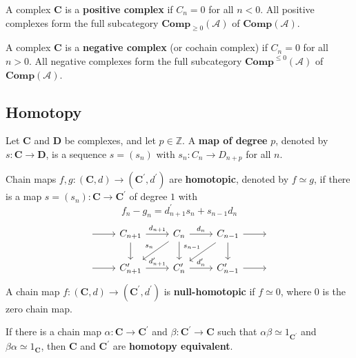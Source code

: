 \documentclass[12pt, oneside]{book}
\begin{document}
\begin{definition}
    A complex $\mathbf{C}$ is a \textbf{positive complex} if $C_n=0$ for all $n<0$.
    All positive complexes form the full subcategory $\mathbf{C o m p}_{\geq 0}(\mathcal{A})$ of $\mathbf{C o m p}(\mathcal{A})$.

    A complex $\mathbf{C}$ is a \textbf{negative complex} (or cochain complex) if $C_n=0$ for all $n>0$.
    All negative complexes form the full subcategory $\mathbf{C o m p}^{\leq 0}(\mathcal{A})$ of $\mathbf{C o m p}(\mathcal{A})$.

\end{definition}


\subsection{Homotopy} %
\begin{definition}
    Let $\mathbf{C}$ and $\mathbf{D}$ be complexes, and let $p \in \mathbb{Z}$.
    A \textbf{map of degree} $p$, denoted by $s: \mathbf{C} \rightarrow \mathbf{D}$, is a sequence $s=\left(s_n\right)$ with $s_n: C_n \rightarrow D_{n+p}$ for all $n$.
\end{definition}

\begin{definition}
    Chain maps $f, g:(\mathbf{C}, d) \rightarrow\left(\mathbf{C}^{\prime}, d^{\prime}\right)$ are \textbf{homotopic}, denoted by $f \simeq g$, if there is a map $s=\left(s_n\right): \mathbf{C} \rightarrow \mathbf{C}^{\prime}$ of degree $1$ with
    \begin{equation*}
        f_n-g_n=d_{n+1}^{\prime} s_n+s_{n-1} d_n
    \end{equation*}
    \begin{equation*}
        \begin{tikzcd}
            {} \arrow[r]
            & C_{n+1} \arrow[r, "d_{n+1}"] \arrow[d, ""]
            & C_n \arrow[r, "d_n"] \arrow[d, ""] \arrow[dl, "s_n"']
            & C_{n-1} \arrow[r] \arrow[d, ""] \arrow[dl, "s_{n-1}"']
            & {} \\
            {} \arrow[r]
            & C'_{n+1} \arrow[r, "d'_{n+1}"]
            & C'_n \arrow[r, "d'_n"]
            & C'_{n-1} \arrow[r]
            & {}
        \end{tikzcd}
    \end{equation*}
    A chain map $f:(\mathbf{C}, d) \rightarrow\left(\mathbf{C}^{\prime}, d^{\prime}\right)$ is \textbf{null-homotopic} if $f \simeq 0$, where $0$ is the zero chain map.

    If there is a chain map $\alpha: \mathbf{C} \rightarrow \mathbf{C}^{\prime} $ and $\beta: \mathbf{C}^{\prime}  \rightarrow \mathbf{C}$ such that $\alpha \beta \simeq 1_{\mathbf{C}^{\prime}}$ and $\beta \alpha \simeq 1_{\mathbf{C}}$, then $\mathbf{C}$ and $\mathbf{C}^{\prime}$ are \textbf{homotopy equivalent}.
\end{definition}
\end{document}

